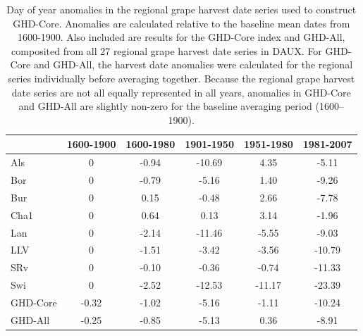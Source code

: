 \documentclass[12pt]{article}
\begin{document}
\begin{table}
\small
\caption{\small Day of year anomalies in the regional grape harvest date series used to construct GHD-Core. Anomalies are calculated relative to the baseline mean dates from 1600-1900. Also included are results for the GHD-Core index and GHD-All, composited from all 27 regional grape harvest date series in DAUX. For GHD-Core and GHD-All, the harvest date anomalies were calculated for the regional series individually before averaging together. Because the regional grape harvest date series are not all equally represented in all years, anomalies in GHD-Core and GHD-All are slightly non-zero for the baseline averaging period (1600--1900).}
\centering
\begin{tabular}{l c c c c c}
\hline
& \bf 1600-1900 & \bf 1600-1980 & \bf 1901-1950 & \bf 1951-1980 & \bf 1981-2007\\
\hline
Als	& 0	& -0.94 & -10.69 & 4.35 & -5.11\\
Bor	& 0 & -0.79 & -5.16 & 1.40 & -9.26\\
Bur	& 0	& 0.15	& -0.48	& 2.66	& -7.78\\
Cha1	& 0	& 0.64	& 0.13	& 3.14	& -1.96\\
Lan & 0 & -2.14 & -11.46 & -5.55 & -9.03\\
LLV	& 0	& -1.51	& -3.42	& -3.56	& -10.79\\
SRv & 0	& -0.10	& -0.36	& -0.74	& -11.33\\
Swi	& 0	& -2.52	& -12.53	& -11.17	& -23.39\\
\hline
GHD-Core & -0.32 & -1.02	& -5.16 & -1.11 & -10.24\\
GHD-All	& -0.25 & -0.85 & -5.13 & 0.36 & -8.91\\
\hline
\end{tabular}
\end{table}
\end{document}
